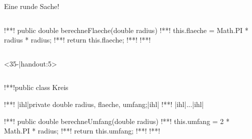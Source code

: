\begin{frame}[c,fragile]{Eine runde Sache!}
\begin{onlyenv}
\begin{columns}[c,onlytextwidth]
\begin{plainjava}
{!**!   public double berechneFlaeche(double radius) {
!**!       this.flaeche = Math.PI * radius * radius;
!**!       return this.flaeche;
!**!   }
!**!}
\end{plainjava}
\end{columns}
\end{onlyenv}
\begin{onlyenv}<35-|handout:5>
\begin{columns}[c,onlytextwidth]
\footnotesize{}
\SetupLstHl
\begin{plainjava}
!**!public class Kreis {
!**!   |ihl|private double radius, flaeche, umfang;|ihl|
!**!   |ihl|...|ihl|

!**!   public double berechneUmfang(double radius) {
!**!       this.umfang = 2 * Math.PI * radius;
!**!       return this.umfang;
!**!   }
!**!}
\end{plainjava}
\end{columns}
\end{onlyenv}
\end{frame}

